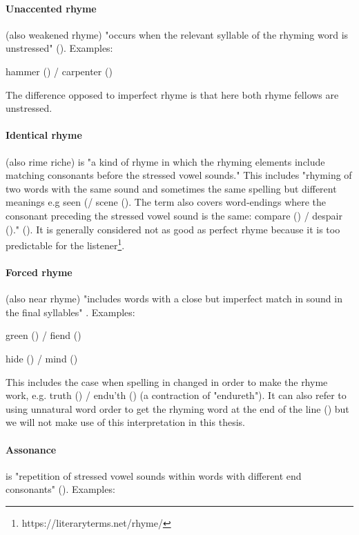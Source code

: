 \paragraph{Unaccented rhyme} (also weakened rhyme) "occurs when the relevant syllable of the rhyming word is unstressed" (\cite{britannica}). Examples: 

hammer () / carpenter ()

\noindent The difference opposed to imperfect rhyme is that here both rhyme fellows are unstressed.


\paragraph{Identical rhyme} (also rime riche) is "a kind of rhyme in which the rhyming elements include matching consonants before the stressed vowel sounds." This includes "rhyming of two words with the same sound and sometimes the same spelling but different meanings e.g seen (/ scene (). The term also covers word‐endings where the consonant preceding the stressed vowel sound is the same: compare () / despair ()." (\cite{oxforddict2008literary}). It is generally considered not as good as perfect rhyme because it is too predictable for the listener\footnote{https://literaryterms.net/rhyme/}.

\paragraph{Forced rhyme} (also near rhyme) "includes words with a close but imperfect match in sound in the final syllables" \cite{bergman2017litcharts}. Examples: 

green () / fiend ()

hide () / mind ()

\noindent This includes the case when spelling in changed in order to make the rhyme work, e.g. truth () / endu'th () (a contraction of "endureth"). It can also refer to using unnatural word order to get the rhyming word at the end of the line (\cite{bergman2017litcharts}) but we will not make use of this interpretation in this thesis.

\paragraph{Assonance} is "repetition of stressed vowel sounds within words with different end consonants" (\cite{britannica}). Examples:	

